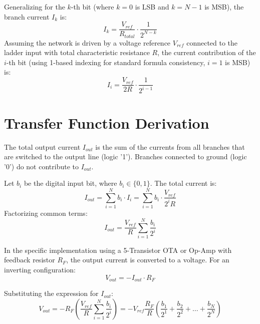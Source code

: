 \documentclass[11pt, a4paper]{article}
\begin{document}
Generalizing for the $k$-th bit (where $k=0$ is LSB and $k=N-1$ is MSB), the branch current $I_k$ is:
\begin{equation}
    I_k = \frac{V_{ref}}{R_{total}} \cdot \frac{1}{2^{N-k}}
\end{equation}
Assuming the network is driven by a voltage reference $V_{ref}$ connected to the ladder input with total characteristic resistance $R$, the current contribution of the $i$-th bit (using 1-based indexing for standard formula consistency, $i=1$ is MSB) is:
\begin{equation}
    I_i = \frac{V_{ref}}{2R} \cdot \frac{1}{2^{i-1}}
\end{equation}

\section{Transfer Function Derivation}

The total output current $I_{out}$ is the sum of the currents from all branches that are switched to the output line (logic '1'). Branches connected to ground (logic '0') do not contribute to $I_{out}$.

Let $b_i$ be the digital input bit, where $b_i \in \{0, 1\}$. The total current is:
\begin{equation}
    I_{out} = \sum_{i=1}^{N} b_i \cdot I_i = \sum_{i=1}^{N} b_i \cdot \frac{V_{ref}}{2^i R}
\end{equation}
Factorizing common terms:
\begin{equation}
    I_{out} = \frac{V_{ref}}{R} \sum_{i=1}^{N} \frac{b_i}{2^i}
\end{equation}

In the specific implementation using a 5-Transistor OTA or Op-Amp with feedback resistor $R_F$, the output current is converted to a voltage. For an inverting configuration:
\begin{equation}
    V_{out} = - I_{out} \cdot R_F
\end{equation}

Substituting the expression for $I_{out}$:
\begin{equation}
    V_{out} = - R_F \left( \frac{V_{ref}}{R} \sum_{i=1}^{N} \frac{b_i}{2^i} \right) = - V_{ref} \frac{R_F}{R} \left( \frac{b_1}{2^1} + \frac{b_2}{2^2} + \dots + \frac{b_N}{2^N} \right)
\end{equation}
\end{document}
